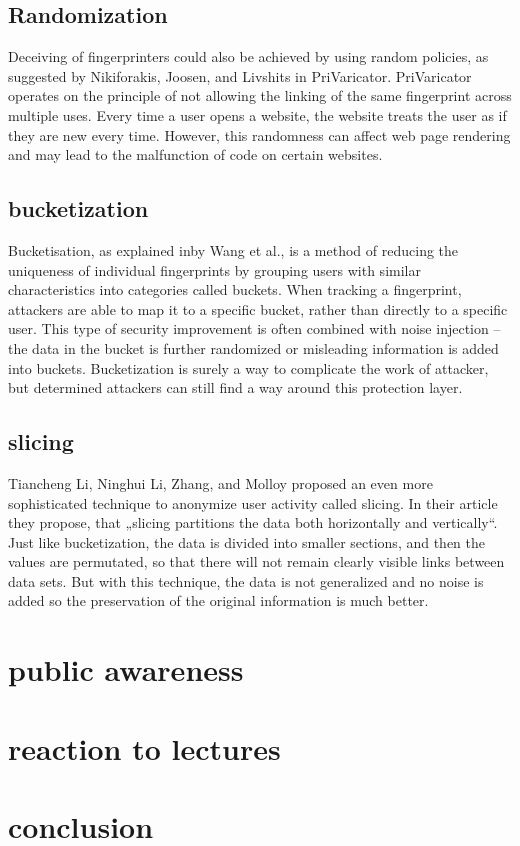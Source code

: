 \documentclass[10pt,a4paper,column]{article}
\begin{document}
\subsection{Randomization}
Deceiving of fingerprinters could also be achieved by using random policies, as suggested by Nikiforakis, Joosen, and Livshits in PriVaricator\cite{PriVaricator}. PriVaricator operates on the principle of not allowing the linking of the same fingerprint across multiple uses. Every time a user opens a website, the website treats the user as if they are new every time. However, this randomness can affect web page rendering and may lead to the malfunction of code on certain websites.
\subsection{bucketization}
Bucketisation, as explained in\cite{bucketization}by Wang et al., is a method of reducing the uniqueness of individual fingerprints by grouping users with similar characteristics into categories called buckets. When tracking a fingerprint, attackers are able to map it to a specific bucket, rather than directly to a specific user. This type of security improvement is often combined with noise injection – the data in the bucket is further randomized or misleading information is added into buckets. Bucketization is surely a way to complicate the work of attacker, but determined attackers can still find a way around this protection layer.
\subsection{slicing} 
Tiancheng Li, Ninghui Li, Zhang, and Molloy proposed an even more sophisticated technique to anonymize user activity called slicing. In their article\cite{slicing} they propose, that „slicing partitions the data both horizontally and vertically“. Just like bucketization, the data is divided into smaller sections, and then the values are permutated, so that there will not remain clearly visible links between data sets. But with this technique, the data is not generalized and no noise is added so the preservation of the original information is much better. 
\section{public awareness} 
\section{reaction to lectures}
\section{conclusion} 





\end{document}
